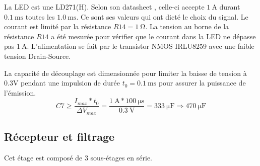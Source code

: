 \documentclass[french]{layout/Report}
\begin{document}
La LED est une LD271(H). Selon son datasheet \cite{LD271(H)}, celle-ci accepte $\SI{1}{\ampere}$ durant $\SI{0.1}{\milli\second}$ toutes les $\SI{1.0}{\milli\second}$. Ce sont ses valeurs qui ont dicté le choix du signal. Le courant est limité par la résistance $\mathit{R14} = \SI{1}{\ohm}$. 
La tension au borne de la résistance $\mathit{R14}$ a été mesurée pour vérifier que le courant dans la LED ne dépasse pas $\SI{1}{\ampere}$.
L'alimentation se fait par le transistor NMOS IRLU8259\cite{IRLU8259} avec une faible tension Drain-Source.

La capacité de découplage est dimensionnée pour limiter la baisse de tension à 0.3V pendant une impulsion de durée $t_0 = \SI{0.1}{\milli\second}$ pour assurer la puissance de l'émission.
\begin{equation*}
	\mathit{C7} \ge \frac{I_{max}*t_0}{\Delta V_{max}} = \frac{\SI{1}{\ampere}*\SI{100}{\micro\second}}{\SI{0.3}{\volt}} = \SI{333}{\micro\farad} \Rightarrow \SI{470}{\micro\farad}
\end{equation*}


\subsection{Récepteur et filtrage}
Cet étage est composé de 3 sous-étages en série.
\end{document}
